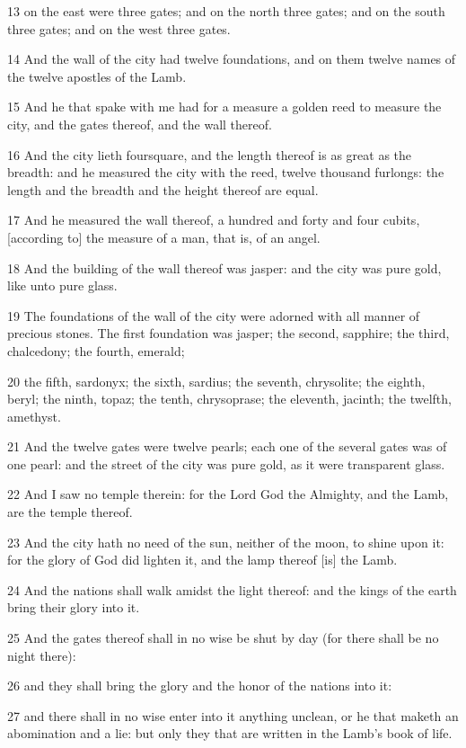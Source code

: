 \par 13 on the east were three gates; and on the north three gates; and on the south three gates; and on the west three gates.
\par 14 And the wall of the city had twelve foundations, and on them twelve names of the twelve apostles of the Lamb.
\par 15 And he that spake with me had for a measure a golden reed to measure the city, and the gates thereof, and the wall thereof.
\par 16 And the city lieth foursquare, and the length thereof is as great as the breadth: and he measured the city with the reed, twelve thousand furlongs: the length and the breadth and the height thereof are equal.
\par 17 And he measured the wall thereof, a hundred and forty and four cubits, [according to] the measure of a man, that is, of an angel.
\par 18 And the building of the wall thereof was jasper: and the city was pure gold, like unto pure glass.
\par 19 The foundations of the wall of the city were adorned with all manner of precious stones. The first foundation was jasper; the second, sapphire; the third, chalcedony; the fourth, emerald;
\par 20 the fifth, sardonyx; the sixth, sardius; the seventh, chrysolite; the eighth, beryl; the ninth, topaz; the tenth, chrysoprase; the eleventh, jacinth; the twelfth, amethyst.
\par 21 And the twelve gates were twelve pearls; each one of the several gates was of one pearl: and the street of the city was pure gold, as it were transparent glass.
\par 22 And I saw no temple therein: for the Lord God the Almighty, and the Lamb, are the temple thereof.
\par 23 And the city hath no need of the sun, neither of the moon, to shine upon it: for the glory of God did lighten it, and the lamp thereof [is] the Lamb.
\par 24 And the nations shall walk amidst the light thereof: and the kings of the earth bring their glory into it.
\par 25 And the gates thereof shall in no wise be shut by day (for there shall be no night there):
\par 26 and they shall bring the glory and the honor of the nations into it:
\par 27 and there shall in no wise enter into it anything unclean, or he that maketh an abomination and a lie: but only they that are written in the Lamb's book of life.

